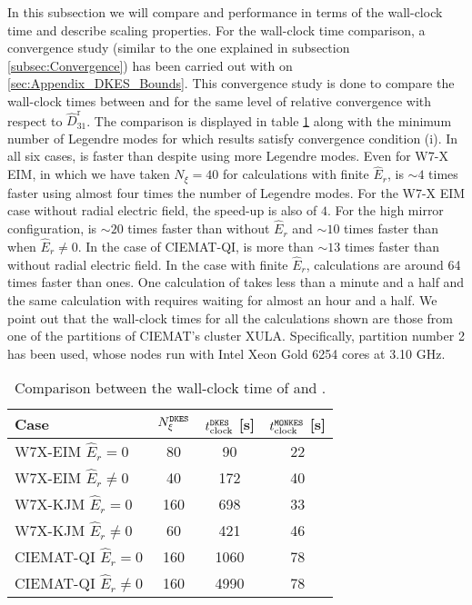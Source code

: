  In this subsection we will compare {\MONKES} and {\DKES} performance in terms of the wall-clock time and describe {\MONKES} scaling properties. For the wall-clock time comparison, a convergence study (similar to the one explained in subsection \ref{subsec:Convergence}) has been carried out with {\DKES} on \ref{sec:Appendix_DKES_Bounds}. This convergence study is done to compare the wall-clock times between {\MONKES} and {\DKES} for the same level of relative convergence with respect to $\widehat{D}_{31}^{\text{r}}$. The comparison is displayed in table \ref{tab:DKES_MONKES_Comparison} along with the minimum number of Legendre modes for which {\DKES} results satisfy convergence condition (i). In all six cases, {\MONKES} is faster than {\DKES} despite using more Legendre modes. Even for W7-X EIM, in which we have taken $N_\xi =40$ for {\DKES} calculations with finite $\widehat{E}_r$, {\MONKES} is $\sim 4$ times faster using almost four times the number of Legendre modes. For the W7-X EIM case without radial electric field, the speed-up is also of $ 4$. For the high mirror configuration, {\MONKES} is $\sim 20$ times faster than {\DKES} without $\widehat{E}_r$ and $\sim 10$ times faster than {\DKES} when $\widehat{E}_r \ne 0$. In the case of CIEMAT-QI, {\MONKES} is more than $\sim 13$ times faster than {\DKES} without radial electric field. In the case with finite $\widehat{E}_r$, {\MONKES} calculations are around 64 times faster than {\DKES} ones. One calculation of {\MONKES} takes less than a minute and a half and the same calculation with {\DKES} requires waiting for almost an hour and a half. We point out that the wall-clock times for all the calculations shown are those from one of the partitions of CIEMAT's cluster XULA. Specifically, partition number 2 has been used, whose nodes run with Intel Xeon Gold 6254 cores at 3.10 GHz. 
 
 \begin{table}[h]
 	\centering
 	\begin{tabular}{lccc}
 		\toprule
 		Case   & $N_\xi^{{\texttt{DKES}}}$ & $t_{\text{clock}}^{{\texttt{DKES}}}$  [s] & $t_{\text{clock}}^{{\texttt{MONKES}}}$  {[}s{]} \\ \midrule
 		W7X-EIM $\widehat{E}_r=0$                                   & 80          &  90      &         22      \\
 		W7X-EIM $\widehat{E}_r\ne 0$                                & {40}          &  {172}     &         40      \\ 
 		W7X-KJM $\widehat{E}_r=0$                                   & 160         &  698     &         33      \\
 		W7X-KJM $\widehat{E}_r\ne 0$                                & 60          &  421     &         46      \\
 		CIEMAT-QI $\widehat{E}_r=0$                                 & 160         &  1060    &         78      \\
 		CIEMAT-QI $\widehat{E}_r\ne 0$                              & 160         &  4990    &         78                    \\\bottomrule
 	\end{tabular}
 	\caption{Comparison between the wall-clock time of {\DKES} and {\MONKES}.}
 	\label{tab:DKES_MONKES_Comparison}
 \end{table}
 
